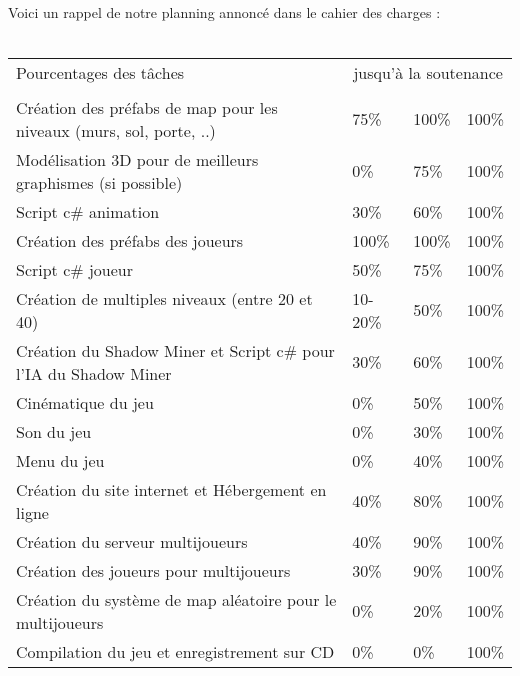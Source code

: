 \documentclass[titlepage, 13px, a4paper]{report}
\begin{document}
\paragraph{} \hspace{0pt}
Voici un rappel de notre planning annoncé dans le cahier des charges :
\\ \\
{\small
	\begin{tabular}{|p{7.2cm}|p{1.2cm}|p{1.2cm}|p{1.2cm}|}
		\hline
		Pourcentages des tâches & \multicolumn{3}{|c|}{jusqu'à la soutenance} \\ 
		\cline{2-4}
			& \no 1 & \no 2 & \no 3 \\
		\hline
		Création des préfabs de map pour les niveaux (murs, sol, porte, ..) & 75\% & 100\% & 100\% \\
		\hline
		Modélisation 3D pour de meilleurs graphismes (si possible) & 0\% & 75\% & 100\% \\
		\hline
		Script c\# animation & 30\% & 60\% & 100\% \\
		\hline
		Création des préfabs des joueurs & 100\% & 100\% & 100\% \\
		\hline
		Script c\# joueur & 50\% & 75\% & 100\% \\
		\hline
		Création de multiples niveaux (entre 20 et 40) & 10-20\% & 50\% & 100\% \\
		\hline
		Création du Shadow Miner et Script c\# pour l'IA du Shadow Miner & 30\% & 60\% & 100\% \\
		\hline
		Cinématique du jeu & 0\% & 50\% & 100\% \\
		\hline
		Son du jeu & 0\% & 30\% & 100\% \\
		\hline
		Menu du jeu & 0\% & 40\% & 100\% \\
		\hline
		Création du site internet et Hébergement en ligne & 40\% & 80\% & 100\% \\
		\hline
		Création du serveur multijoueurs & 40\% & 90\% & 100\% \\
		\hline
		Création des joueurs pour multijoueurs & 30\% & 90\% & 100\% \\
		\hline
		Création du système de map aléatoire pour le multijoueurs & 0\% & 20\% & 100\% \\
		\hline
		Compilation du jeu et enregistrement sur CD & 0\% & 0\% & 100\% \\
		\hline 
		\end{tabular}
	\label{Planning}	
}


\end{document}
